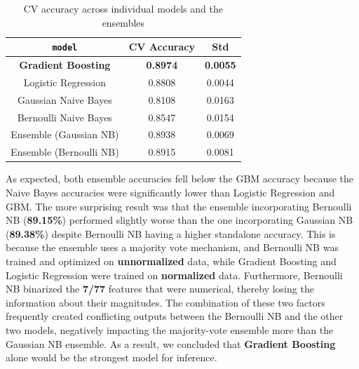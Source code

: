\documentclass[12pt]{article}
\begin{document}
\begin{table}[H]
\centering
\caption{CV accuracy across individual models and the ensembles}
\label{tab:depth}
\begin{tabular}{ccc}
\toprule
\texttt{model} & CV Accuracy & Std \\
\midrule
\textbf{Gradient Boosting} & \textbf{0.8974} & \textbf{0.0055} \\
Logistic Regression & 0.8808 & 0.0044 \\
Gaussian Naive Bayes & 0.8108 & 0.0163 \\
Bernoulli Naive Bayes & 0.8547 & 0.0154 \\
Ensemble (Gaussian NB) & 0.8938 & 0.0069 \\
Ensemble (Bernoulli NB) & 0.8915 & 0.0081 \\
\bottomrule
\end{tabular}
\end{table}
As expected, both ensemble accuracies fell below the GBM accuracy because the Naive Bayes accuracies were significantly lower than Logistic Regression and GBM. The more surprising result was that the ensemble incorporating Bernoulli NB (\textbf{89.15\%}) performed slightly worse than the one incorporating Gaussian NB (\textbf{89.38\%}) despite
Bernoulli NB having a higher standalone accuracy. This is
because the ensemble uses a majority vote mechanism, and Bernoulli
NB was trained and optimized on \textbf{unnormalized} data, while Gradient
Boosting and Logistic Regression were trained on \textbf{normalized}
data. Furthermore, Bernoulli NB binarized the \textbf{7/77} features that were numerical, thereby losing the information about their magnitudes. The combination of these two factors frequently created conflicting outputs between the Bernoulli NB and the other two models, negatively impacting the majority-vote ensemble more than the Gaussian NB ensemble. As a result, we concluded that \textbf{Gradient Boosting} alone would be the strongest model for inference.



\end{document}
